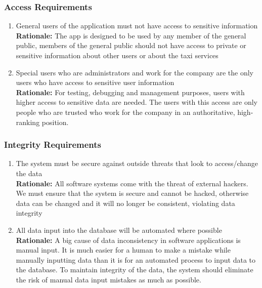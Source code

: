 \documentclass[]{article}
\begin{document}
\subsubsection{Access Requirements}
\label{ssub:access_requirements}
\begin{enumerate}[{SR-AC}1. ]
	\item General users of the application must not have access to sensitive information \\
	{\bf Rationale:} The app is designed to be used by any member of the general public, members of the general public should not have access to private or sensitive information about other users or about the taxi services 
	\item Special users who are administrators and work for the company are the only users who have access to sensitive user information \\
	{\bf Rationale:} For testing, debugging and management purposes, users with higher access to sensitive data are needed. The users with this access are only people who are trusted who work for the company in an authoritative, high-ranking position.
\end{enumerate}

\subsubsection{Integrity Requirements}
\label{ssub:integrity_requirements}
\begin{enumerate}[{SR-INT}1. ]
	\item The system must be secure against outside threats that look to access/change the data \\
	{\bf Rationale:} All software systems come with the threat of external hackers. We must ensure that the system is secure and cannot be hacked, otherwise data can be changed and it will no longer be consistent, violating data integrity 
	\item All data input into the database will be automated where possible \\
	{\bf Rationale:} A big cause of data inconsistency in software applications is manual input. It is much easier for a human to make a mistake while manually inputting data than it is for an automated process to input data to the database. To maintain integrity of the data, the system should eliminate the risk of manual data input mistakes as much as possible.
\end{enumerate}
\end{document}
